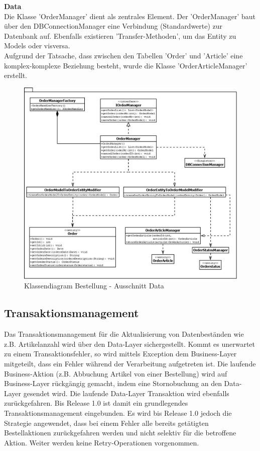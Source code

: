 \clearpage
\textbf{Data}\\
Die Klasse 'OrderManager' dient als zentrales Element. Der 'OrderManager' baut über den DBConnectionManager eine Verbindung (Standardwerte) zur Datenbank auf. Ebenfalls existieren 'Transfer-Methoden', um das Entity zu Models oder visversa.\\
Aufgrund der Tatsache, dass zwischen den Tabellen 'Order' und 'Article' eine komplex-komplexe Beziehung besteht, wurde die Klasse 'OrderArticleManager' erstellt.
\begin{figure}[H]
	\centering
	\includegraphics[width=1.0\linewidth]{Images/Class-Order-Data}
	\caption{Klassendiagram Bestellung - Ausschnitt Data}
	\label{fig:class-order-data}
\end{figure}
\clearpage

\subsection{Transaktionsmanagement}
Das Transaktionsmanagement für die Aktualisierung von Datenbeständen wie z.B. Artikelanzahl wird über den Data-Layer sichergestellt. Kommt es unerwartet zu einem Transaktionsfehler, so wird mittels Exception dem Business-Layer mitgeteilt, dass ein Fehler während der Verarbeitung aufgetreten ist. Die laufende Business-Aktion (z.B. Abbuchung Artikel von einer Bestellung) wird auf Business-Layer rückgängig gemacht, indem eine Stornobuchung an den Data-Layer gesendet wird. Die laufende Data-Layer Transaktion wird ebenfalls zurückgefahren.
Bis Release 1.0 ist damit ein grundlegendes Transaktionsmanagement eingebunden. Es wird bis Release 1.0 jedoch die Strategie angewendet, dass bei einem Fehler alle bereits getätigten Bestellaktionen zurückgefahren werden und nicht selektiv für die betroffene Aktion. Weiter werden keine Retry-Operationen vorgenommen.

